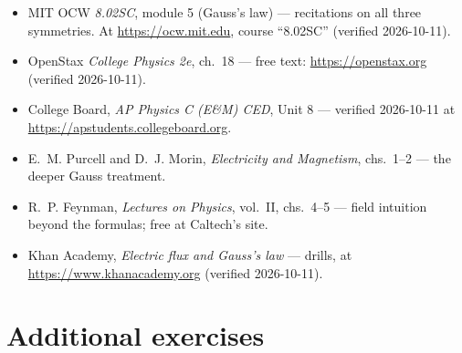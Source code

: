 \begin{itemize}
\item MIT OCW \emph{8.02SC}, module 5 (Gauss's law) ---
recitations on all three symmetries. At \url{https://ocw.mit.edu},
course ``8.02SC'' (verified 2026-10-11).
\item OpenStax \emph{College Physics 2e}, ch.~18 ---
free text: \url{https://openstax.org} (verified 2026-10-11).
\item College Board, \emph{AP Physics C (E\&M) CED}, Unit 8 ---
verified 2026-10-11 at
\url{https://apstudents.collegeboard.org}.
\item E.~M. Purcell and D.~J. Morin, \emph{Electricity and Magnetism},
chs.~1--2 --- the deeper Gauss treatment.
\item R.~P. Feynman, \emph{Lectures on Physics}, vol.~II, chs.~4--5 ---
field intuition beyond the formulas; free at Caltech's site.
\item Khan Academy, \emph{Electric flux and Gauss's law} --- drills, at
\url{https://www.khanacademy.org} (verified 2026-10-11).
\end{itemize}

\section*{Additional exercises}

